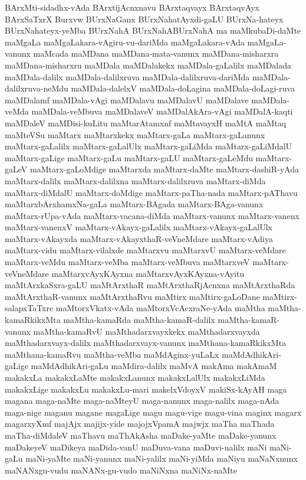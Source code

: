 {BArxMti-sidadhx-vAda
BArxtijAcnxnavu
BArxtaqvayx
BArxtaqvAyx
BArxSaTxrX
Burxvw
BUrxNaGanx
BUrxNahatAyxdi-gaLU
BUrxNa-hateyx
BUrxNahateyx-yeMba
BUrxNahA
BUrxNahABUrxNahA
ma
maMkubaDi-daMte
maMgaLa
maMgaLakara-vAgiru-vu-dariMda
maMgaLakara-vAda
maMgaLa-vanunx
maMcada
maMDana
maMDana-mata-vanunx
maMDana-misharxra
maMDana-misharxru
maMDala
maMDalakekx
maMDala-gaLalilx
maMDalada
maMDala-dalilx
maMDala-dalilxruva
maMDala-dalilxruva-dariMda
maMDala-dalilxruva-neMdu
maMDala-dalelxV
maMDala-doLagina
maMDala-doLagi-ruva
maMDalamf
maMDala-vAgi
maMDalavu
maMDalavU
maMDalave
maMDala-veMda
maMDala-veMbuva
maMDalaveV
maMDalAkAra-vAgi
maMDalA-kaqti
maMDaleV
maMDisi-kuLitu
maMtarAtamxnf
maMtavayxH
maMtA
maMtaq
maMteVSu
maMtarx
maMtarxkekx
maMtarx-gaLa
maMtarx-gaLanunx
maMtarx-gaLalilx
maMtarx-gaLalUlx
maMtarx-gaLiMda
maMtarx-gaLiMdalU
maMtarx-gaLige
maMtarx-gaLu
maMtarx-gaLU
maMtarx-gaLeMdu
maMtarx-gaLeV
maMtarx-gaLoMdige
maMtarxda
maMtarx-daMte
maMtarx-dashiR-yAda
maMtarx-dalilx
maMtarx-dalilxna
maMtarx-dalilxruva
maMtarx-diMda
maMtarx-diMdalU
maMtarx-doMdige
maMtarx-paTha-nada
maMtarx-pAThavu
maMtarxbArxhamxNa-gaLa
maMtarx-BAgada
maMtarx-BAga-vanunx
maMtarx-rUpa-vAda
maMtarx-vacana-diMda
maMtarx-vanunx
maMtarx-vanenx
maMtarx-vanenxV
maMtarx-vAkayx-gaLalilx
maMtarx-vAkayx-gaLalUlx
maMtarx-vAkayxda
maMtarx-vAkayxthaR-veVneMdare
maMtarx-vAdiya
maMtarx-vidu
maMtarx-vilalxde
maMtarxvu
maMtarxvU
maMtarx-veMdare
maMtarx-veMdu
maMtarx-veMba
maMtarx-veMbuva
maMtarxveV
maMtarx-veVneMdare
maMtarxvAyxKAyxna
maMtarxvAyxKAyxna-vAyitu
maMtArxkaSxra-gaLU
maMtArxthaR
maMtArxthaRjAcnxna
maMtArxthaRda
maMtArxthaR-vanunx
maMtArxthaRvu
maMtirx
maMtirx-gaLoDane
maMtirx-salapxTaTxre
maMtorxVkatx-vAda
maMtorxVcAcxraNe-yAda
maMtha
maMtha-kamaRkikxMta
maMtha-kamaRda
maMtha-kamaR-dalilx
maMtha-kamaR-vanunx
maMtha-kamaRvU
maMthadarxvayxkekx
maMthadarxvayxda
maMthadarxvayx-dalilx
maMthadarxvayx-vanunx
maMthana-kamaRkikxMta
maMthana-kamaRvu
maMtha-veMba
maMdAginx-yuLaLx
maMdAdhikAri-gaLige
maMdAdhikAri-gaLu
maMdira-dalilx
maMvA
makAma
makAmaM
makakxLa
makakxLaMte
makakxLanunx
makakxLalUlx
makakxLiMda
makakxLige
makakxLu
makakxLu-mari
makelxVdoyxV
makiSx-kAyAH
maga
magana
maga-naMte
maga-naMteyU
maga-nanunx
maga-nalilx
maga-nAda
maga-nige
maganu
magane
magaLige
magu
magu-vige
magu-vina
maginx
magarx
magarxyXmf
majAjx
majijx-yide
majojxVpamA
majwjx
maTha
maThada
maTha-diMdaleV
maThavu
maThAkAsha
maDake-yaMte
maDake-yanunx
maDakeyeV
maDikeya
maDida-vanU
maDuva-vana
maDuvi-nalilx
maNi
maNi-gaLu
maNi-yaMte
maNi-yanunx
maNi-yalilx
maNi-yiMda
maNiyu
maNaNxnunx
maNANxgu-vudu
maNANx-gu-vudo
maNiNxna
maNiNx-naMte
}
